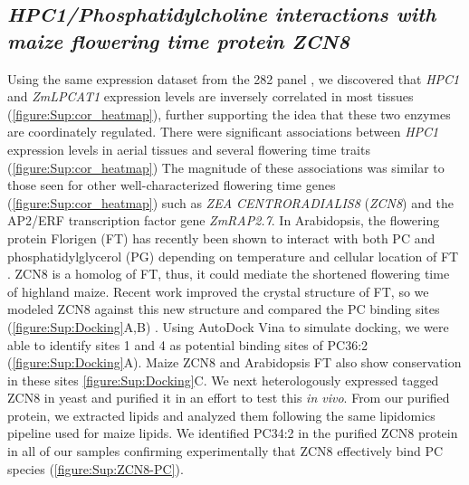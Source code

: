 \documentclass[9pt,twocolumn,twoside,lineno]{biorxiv}
\newcommand{\hpc}{\textit{HPC1}\xspace}
\begin{document}
\subsection{\textit{HPC1/Phosphatidylcholine interactions with maize flowering time protein ZCN8}}
Using the same expression dataset from the 282 panel \cite{Kremling2018-gn}, we discovered that \hpc and \textit{ZmLPCAT1} expression levels are inversely correlated in most tissues (\cref{figure:Sup:cor_heatmap}), further supporting the idea that these two enzymes are coordinately regulated.
There were significant associations between \hpc expression levels in aerial tissues and several flowering time traits (\cref{figure:Sup:cor_heatmap})
The magnitude of these associations was similar to those seen for other well-characterized flowering time genes (\cref{figure:Sup:cor_heatmap}) such as \textit{ZEA CENTRORADIALIS8} (\textit{ZCN8})  and the AP2/ERF transcription factor gene \textit{ZmRAP2.7}.  
In Arabidopsis, the flowering protein Florigen (FT) has recently been shown to interact with both PC and phosphatidylglycerol (PG) depending on temperature and cellular location of FT \cite{Nakamura2014-qf, Susila2021-dz}.
ZCN8 is a homolog of FT, thus, it could mediate the shortened flowering time of highland maize. 
Recent work improved the crystal structure of FT, so we modeled ZCN8 against this new structure and compared the PC binding sites (\cref{figure:Sup:Docking}A,B) \cite{Nakamura2019-ht}. 
Using AutoDock Vina to simulate docking, we were able to identify sites 1 and 4 as potential binding sites of PC36:2 (\cref{figure:Sup:Docking}A).
Maize ZCN8 and  Arabidopsis FT also show conservation in these sites \cref{figure:Sup:Docking}C. 
We next heterologously expressed tagged ZCN8 in yeast and purified it in an effort to test this \textit{in vivo}. 
From our purified protein, we extracted lipids and analyzed them following the same lipidomics pipeline used for maize lipids. 
We identified PC34:2 in the purified ZCN8 protein in all of our samples confirming experimentally that ZCN8 effectively bind PC species (\cref{figure:Sup:ZCN8-PC}).
\end{document}
